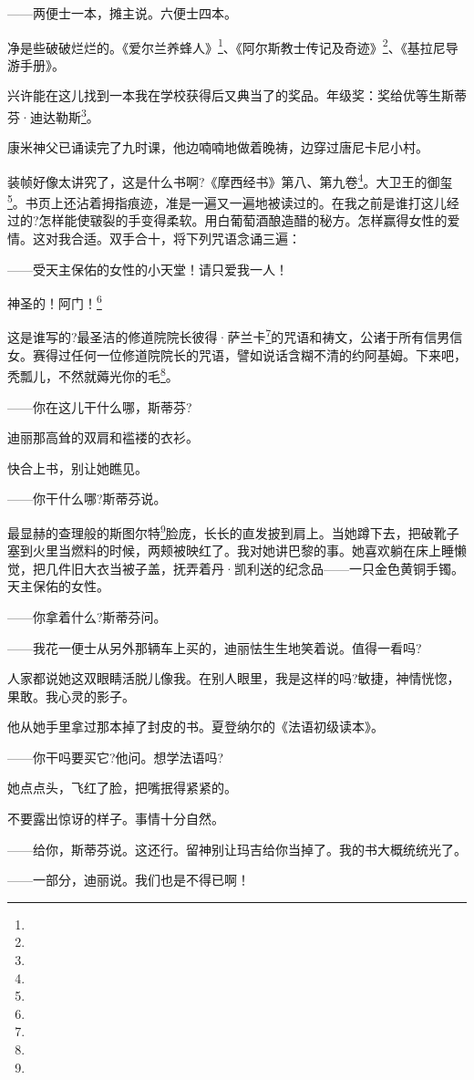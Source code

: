 \par ——两便士一本，摊主说。六便士四本。
\par 净是些破破烂烂的。《爱尔兰养蜂人》\footnote{}、《阿尔斯教士传记及奇迹》\footnote{}、《基拉尼导游手册》。
\par 兴许能在这儿找到一本我在学校获得后又典当了的奖品。年级奖：奖给优等生斯蒂芬·迪达勒斯\footnote{}。
\par 康米神父已诵读完了九时课，他边喃喃地做着晚祷，边穿过唐尼卡尼小村。
\par 装帧好像太讲究了，这是什么书啊?《摩西经书》第八、第九卷\footnote{}。大卫王的御玺\footnote{}。书页上还沾着拇指痕迹，准是一遍又一遍地被读过的。在我之前是谁打这儿经过的?怎样能使皲裂的手变得柔软。用白葡萄酒酿造醋的秘方。怎样赢得女性的爱情。这对我合适。双手合十，将下列咒语念诵三遍：
\par ——受天主保佑的女性的小天堂！请只爱我一人！
\par 神圣的！阿门！\footnote{}
\par 这是谁写的?最圣洁的修道院院长彼得·萨兰卡\footnote{}的咒语和祷文，公诸于所有信男信女。赛得过任何一位修道院院长的咒语，譬如说话含糊不清的约阿基姆。下来吧，秃瓢儿，不然就薅光你的毛\footnote{}。
\par ——你在这儿干什么哪，斯蒂芬?
\par 迪丽那高耸的双肩和褴褛的衣衫。
\par 快合上书，别让她瞧见。
\par ——你干什么哪?斯蒂芬说。
\par 最显赫的查理般的斯图尔特\footnote{}脸庞，长长的直发披到肩上。当她蹲下去，把破靴子塞到火里当燃料的时候，两颊被映红了。我对她讲巴黎的事。她喜欢躺在床上睡懒觉，把几件旧大衣当被子盖，抚弄着丹·凯利送的纪念品——一只金色黄铜手镯。天主保佑的女性。
\par ——你拿着什么?斯蒂芬问。
\par ——我花一便士从另外那辆车上买的，迪丽怯生生地笑着说。值得一看吗?
\par 人家都说她这双眼睛活脱儿像我。在别人眼里，我是这样的吗?敏捷，神情恍惚，果敢。我心灵的影子。
\par 他从她手里拿过那本掉了封皮的书。夏登纳尔的《法语初级读本》。
\par ——你干吗要买它?他问。想学法语吗?
\par 她点点头，飞红了脸，把嘴抿得紧紧的。
\par 不要露出惊讶的样子。事情十分自然。
\par ——给你，斯蒂芬说。这还行。留神别让玛吉给你当掉了。我的书大概统统光了。
\par ——一部分，迪丽说。我们也是不得已啊！
